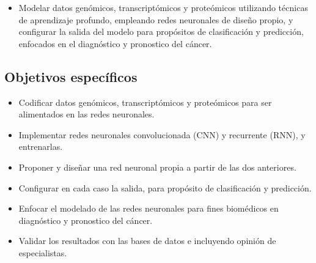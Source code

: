 \begin{itemize}

   \addtolength{\itemsep}{-4mm} %
        \item Modelar datos genómicos, transcriptómicos y proteómicos utilizando técnicas de aprendizaje profundo, empleando redes neuronales de diseño propio, y configurar la salida del modelo para propósitos de clasificación y predicción, enfocados en el diagnóstico y pronostico del cáncer.


    \end{itemize}


\subsection{Objetivos específicos}

\begin{itemize}

   \addtolength{\itemsep}{-4mm} %
        \item Codificar datos genómicos, transcriptómicos y proteómicos para ser alimentados en las redes neuronales.
        \item Implementar redes neuronales convolucionada (CNN) y recurrente (RNN), y entrenarlas.
        \item Proponer y diseñar una red neuronal propia a partir de las dos anteriores.
        \item Configurar en cada caso la salida, para propósito de clasificación y predicción.
        \item Enfocar el modelado de las redes neuronales para fines biomédicos en diagnóstico y pronostico del cáncer.
        \item Validar los resultados con las bases de datos e incluyendo opinión de especialistas.
    \end{itemize}





